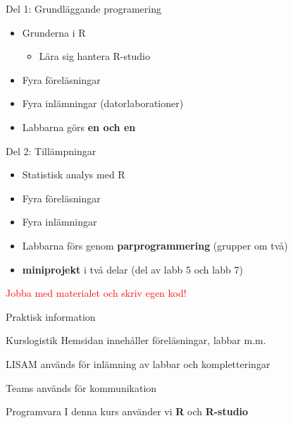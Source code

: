 \documentclass[
  10pt,
  ignorenonframetext,
]{beamer}
\providecommand{\tightlist}{%
  \setlength{\itemsep}{0pt}\setlength{\parskip}{0pt}}
\begin{document}
\begin{frame}{Del 1: Grundläggande programering}
\protect\hypertarget{del-1-grundluxe4ggande-programering}{}
\begin{itemize}
\tightlist
\item
  Grunderna i R

  \begin{itemize}
  \tightlist
  \item
    Lära sig hantera R-studio
  \end{itemize}
\item
  Fyra föreläsningar
\item
  Fyra inlämningar (datorlaborationer)
\item
  Labbarna görs \textbf{en och en}
\end{itemize}
\end{frame}

\begin{frame}{Del 2: Tillämpningar}
\protect\hypertarget{del-2-tilluxe4mpningar}{}
\begin{itemize}
\tightlist
\item
  Statistisk analys med R
\item
  Fyra föreläsningar
\item
  Fyra inlämningar
\item
  Labbarna förs genom \textbf{parprogrammering} (grupper om två)
\item
  \textbf{miniprojekt} i två delar (del av labb 5 och labb 7)
\end{itemize}

\pause

\textcolor{red}{Jobba med materialet och skriv egen kod!}
\end{frame}

\begin{frame}{Praktisk information}
\protect\hypertarget{praktisk-information}{}
\begin{block}{Kurslogistik}
\protect\hypertarget{kurslogistik}{}
Hemsidan innehåller föreläsningar, labbar m.m.

LISAM används för inlämning av labbar och kompletteringar

Teams används för kommunikation
\end{block}

\begin{block}{Programvara}
\protect\hypertarget{programvara}{}
I denna kurs använder vi \textbf{R} och \textbf{R-studio}
\end{block}
\end{frame}
\end{document}
